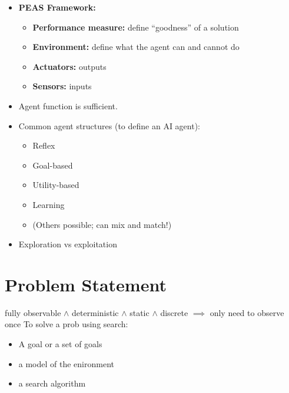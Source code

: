 \documentclass{article}
\begin{document}
\begin{itemize}
    \item \textbf{PEAS Framework:}
    \begin{itemize}
        \item \textbf{Performance measure:} define “goodness” of a solution
        \item \textbf{Environment:} define what the agent can and cannot do
        \item \textbf{Actuators:} outputs
        \item \textbf{Sensors:} inputs
    \end{itemize}
    
    \item Agent function is sufficient.
    
    \item Common agent structures (to define an AI agent):
    \begin{itemize}
        \item Reflex
        \item Goal-based
        \item Utility-based
        \item Learning
        \item (Others possible; can mix and match!)
    \end{itemize}
    
    \item Exploration vs exploitation
\end{itemize}
\section{Problem Statement}
fully observable $\land$ deterministic $\land$ static $\land$ discrete $\implies$ only need to observe once \newline
To solve a prob using search: 
\begin{itemize}
    \item A goal or a set of goals
    \item a model of the enironment  
    \item a search algorithm 
\end{itemize}
\end{document}
